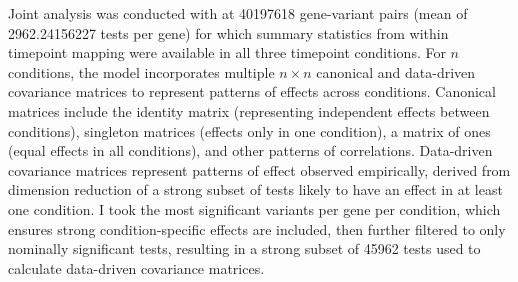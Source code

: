 Joint analysis was conducted with  \autocite{urbut2018FlexibleStatisticalMethods} at \num{40197618} gene-variant pairs (mean of \num[round-mode=places,round-precision=0]{2962.24156227} tests per gene) for which summary statistics from within timepoint mapping were available in all three timepoint conditions.
For $n$ conditions, the  model incorporates multiple $n \times n$ canonical and data-driven covariance matrices to represent patterns of effects across conditions.
Canonical matrices include the identity matrix (representing independent effects between conditions), singleton matrices (effects only in one condition), a matrix of ones (equal effects in all conditions), and other patterns of correlations.
Data-driven covariance matrices represent patterns of effect observed empirically, derived from dimension reduction of a strong subset of tests likely to have an effect in at least one condition.
I took the most significant variants per gene per condition, 
which ensures strong condition-specific effects are included,
then further filtered to only nominally significant tests, 
resulting in a strong subset of 45962 tests used to calculate data-driven covariance matrices.


